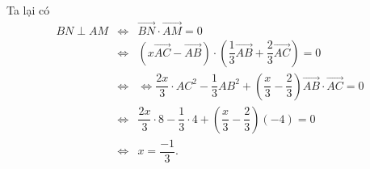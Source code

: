 \begin{bt}
{\begin{listEX}
			Ta lại có 
			\begin{eqnarray*}
				BN \perp AM &\Leftrightarrow&\overrightarrow{BN} \cdot \overrightarrow{AM} =0
				\\&\Leftrightarrow&\left(x\overrightarrow{AC}-\overrightarrow{AB}\right)\cdot \left(\dfrac{1}{3}\overrightarrow{AB}+\dfrac{2}{3}\overrightarrow{AC}\right)=0
				\\&\Leftrightarrow&
				\Leftrightarrow
				\dfrac{2x}{3}\cdot AC^2 - \dfrac{1}{3}AB^2 +\left(\dfrac{x}{3}-\dfrac{2}{3}\right) \overrightarrow{AB} \cdot \overrightarrow{AC}=0
				\\&\Leftrightarrow&	\dfrac{2x}{3}\cdot8 - \dfrac{1}{3}\cdot4 +\left(\dfrac{x}{3}-\dfrac{2}{3}\right) (-4)=0 \\&\Leftrightarrow&	
				x=\dfrac{-1}{3}.
			\end{eqnarray*}
		\end{listEX}
	}
\end{bt}
